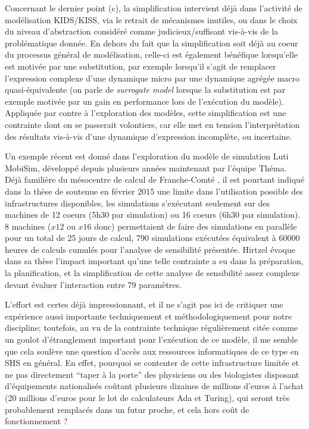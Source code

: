 Concernant le dernier point (c), la simplification intervient déjà dans l'activité de modélisation KIDS/KISS, via le retrait de mécanismes inutiles, ou dans le choix du niveau d'abstraction considéré comme judicieux/suffisant vis-à-vis de la problématique donnée. En dehors du fait que la simplification soit déjà au coeur du processus général de modélisation, celle-ci est également bénéfique lorsqu'elle est motivée par une substitution, par exemple lorsqu'il s'agit de remplacer l'expression complexe d'une dynamique micro par une dynamique agrégée macro quasi-équivalente (on parle de \textit{surrogate model} lorsque la substitution est par exemple motivée par un gain en performance lors de l'exécution du modèle). Appliquée par contre à l'exploration des modèles, cette simplification est une contrainte dont on se passerait volontiers, car elle met en tension l'interprétation des résultats vis-à-vis d'une dynamique d'expression incomplète, ou incertaine.

Un exemple récent est donné dans l'exploration du modèle de simulation Luti MobiSim, développé depuis plusieurs années maintenant par l'équipe Théma. Déjà familière du mésocentre de calcul de Franche-Comté \autocite{Asch2012}, il est pourtant indiqué dans la thèse de \textcite{Hirtzel2015} soutenue en février 2015 une limite dans l'utilisation possible des infrastructures disponibles, les simulations s'exécutant seulement sur des machines de 12 coeurs (5h30 par simulation) ou 16 coeurs (6h30 par simulation). 8 machines ($ x 12$ ou $ x 16$ donc) permettaient de faire des simulations en parallèle pour un total de 25 jours de calcul, 790 simulations exécutées équivalent à 60000 heures de calculs cumulés pour l'analyse de sensibilité présentée. Hirtzel évoque dans sa thèse l'impact important qu'une telle contrainte a eu dans la préparation, la planification, et la simplification de cette analyse de sensibilité assez complexe devant évaluer l'interaction entre 79 paramètres. 

L'effort est certes déjà impressionnant, et il ne s'agit pas ici de critiquer une expérience aussi importante techniquement et méthodologiquement pour notre discipline; toutefois, au vu de la contrainte technique régulièrement citée comme un goulot d'étranglement important pour l'exécution de ce modèle, il me semble que cela soulève une question d'accès aux ressources informatiques de ce type en SHS en général. En effet, pourquoi se contenter de cette infrastructure limitée et ne pas directement \enquote{taper à la porte} des physiciens ou des biologistes disposant d'équipements nationalisés coûtant plusieurs dizaines de millions d'euros à l'achat (20 millions d'euros pour le lot de calculateurs Ada et Turing), qui seront très probablement remplacés dans un futur proche, et cela hors coût de fonctionnement ? 

